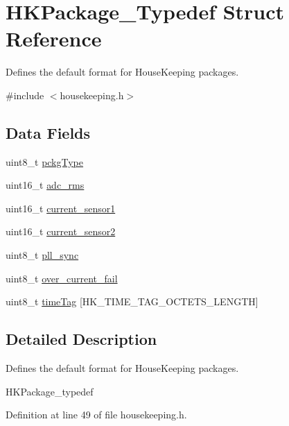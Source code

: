 \hypertarget{struct_h_k_package___typedef}{}\section{H\+K\+Package\+\_\+\+Typedef Struct Reference}
\label{struct_h_k_package___typedef}


Defines the default format for House\+Keeping packages.  




{\ttfamily \#include $<$housekeeping.\+h$>$}

\subsection*{Data Fields}
\begin{DoxyCompactItemize}
\item 
uint8\+\_\+t \hyperlink{struct_h_k_package___typedef_ad1d4ffe1190b53b16f3202b6fdf7a94c}{pckg\+Type}
\item 
uint16\+\_\+t \hyperlink{struct_h_k_package___typedef_aedf362fda3e4e14323b12c20816a9cb4}{adc\+\_\+rms}
\item 
uint16\+\_\+t \hyperlink{struct_h_k_package___typedef_aae01465413323d90b4be7bcaefd7dca9}{current\+\_\+sensor1}
\item 
uint16\+\_\+t \hyperlink{struct_h_k_package___typedef_a5c8e17de486eec209b7621ffe1f2758d}{current\+\_\+sensor2}
\item 
uint8\+\_\+t \hyperlink{struct_h_k_package___typedef_a2fea875df8173545b38377ba6f6ac74a}{pll\+\_\+sync}
\item 
uint8\+\_\+t \hyperlink{struct_h_k_package___typedef_afd52d1f05c868e422ee6707d19189f29}{over\+\_\+current\+\_\+fail}
\item 
uint8\+\_\+t \hyperlink{struct_h_k_package___typedef_a5fee9934ab767f6c0c2ee480c6001a28}{time\+Tag} \mbox{[}H\+K\+\_\+\+T\+I\+M\+E\+\_\+\+T\+A\+G\+\_\+\+O\+C\+T\+E\+T\+S\+\_\+\+L\+E\+N\+G\+TH\mbox{]}
\end{DoxyCompactItemize}


\subsection{Detailed Description}
Defines the default format for House\+Keeping packages. 

H\+K\+Package\+\_\+typedef 

Definition at line 49 of file housekeeping.\+h.




